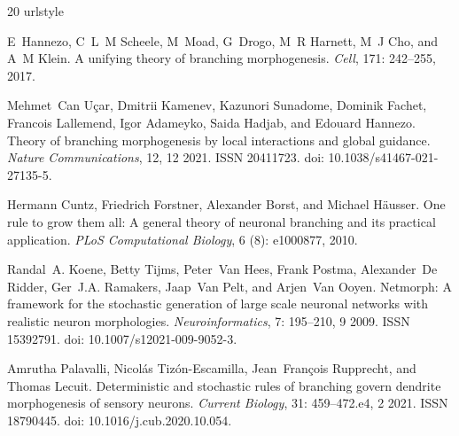 \documentclass[11pt,a4paper]{article}
\begin{document}
%   
\begin{thebibliography}{20}
\providecommand{\natexlab}[1]{#1}
\providecommand{\url}[1]{\texttt{#1}}
\expandafter\ifx\csname urlstyle\endcsname\relax
  \providecommand{\doi}[1]{doi: #1}\else
  \providecommand{\doi}{doi: \begingroup \urlstyle{rm}\Url}\fi

E~Hannezo, C~L~M Scheele, M~Moad, G~Drogo, M~R Harnett, M~J Cho, and A~M Klein.
\newblock A unifying theory of branching morphogenesis.
\newblock \emph{Cell}, 171: 242--255, 2017.

Mehmet~Can Uçar, Dmitrii Kamenev, Kazunori Sunadome, Dominik Fachet, Francois
  Lallemend, Igor Adameyko, Saida Hadjab, and Edouard Hannezo.
\newblock Theory of branching morphogenesis by local interactions and global
  guidance.
\newblock \emph{Nature Communications}, 12, 12 2021.
\newblock ISSN 20411723.
\newblock \doi{10.1038/s41467-021-27135-5}.

Hermann Cuntz, Friedrich Forstner, Alexander Borst, and Michael H{\"a}usser.
\newblock One rule to grow them all: A general theory of neuronal branching and
  its practical application.
\newblock \emph{PLoS Computational Biology}, 6 (8): e1000877,
  2010.

Randal~A. Koene, Betty Tijms, Peter~Van Hees, Frank Postma, Alexander~De
  Ridder, Ger~J.A. Ramakers, Jaap~Van Pelt, and Arjen~Van Ooyen.
\newblock Netmorph: A framework for the stochastic generation of large scale
  neuronal networks with realistic neuron morphologies.
\newblock \emph{Neuroinformatics}, 7: 195--210, 9 2009.
\newblock ISSN 15392791.
\newblock \doi{10.1007/s12021-009-9052-3}.

Amrutha Palavalli, Nicolás Tizón-Escamilla, Jean~François Rupprecht, and
  Thomas Lecuit.
\newblock Deterministic and stochastic rules of branching govern dendrite
  morphogenesis of sensory neurons.
\newblock \emph{Current Biology}, 31: 459--472.e4, 2 2021.
\newblock ISSN 18790445.
\newblock \doi{10.1016/j.cub.2020.10.054}.


\end{thebibliography}
\end{document}
